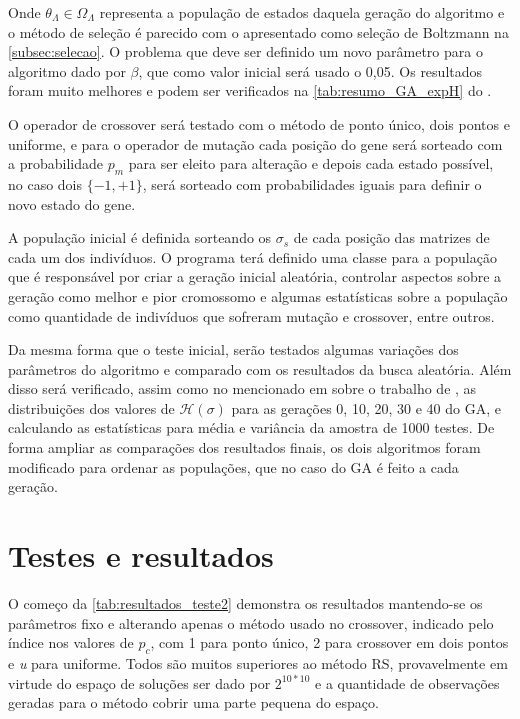 Onde \(\theta_{\Lambda} \in \Omega_{\Lambda} \) representa a população de estados daquela geração do algoritmo e o método de seleção é parecido com o apresentado como seleção de Boltzmann na \autoref{subsec:selecao}. O problema que deve ser definido um novo parâmetro para o algoritmo dado por \(\beta \), que como valor inicial será usado o 0,05. Os resultados foram muito melhores e podem ser verificados na \autoref{tab:resumo_GA_expH} do .

O operador de crossover será testado com o método de ponto único, dois pontos e uniforme, e para o operador de mutação cada posição do gene será sorteado com a probabilidade \(p_m\) para ser eleito para alteração e depois cada estado possível, no caso dois \(\{ -1, +1\}\), será sorteado com probabilidades iguais para definir o novo estado do gene.

A população inicial é definida sorteando os \(\sigma_s\) de cada posição das matrizes de cada um dos indivíduos. O programa terá definido uma classe para a população que é responsável por criar a geração inicial aleatória, controlar aspectos sobre a geração como melhor e pior cromossomo e algumas estatísticas sobre a população como quantidade de indivíduos que sofreram mutação e crossover, entre outros. 

Da mesma forma que o teste inicial, serão testados algumas variações dos parâmetros do algoritmo e comparado com os resultados da busca aleatória. Além disso será verificado, assim como no mencionado em  sobre o trabalho de , as distribuições dos valores de \(\mathcal{H}(\sigma)\) para as gerações 0, 10, 20, 30 e 40 do GA, e calculando as estatísticas para média e variância da amostra de 1000 testes. De forma ampliar as comparações dos resultados finais, os dois algoritmos foram modificado para ordenar as populações, que no caso do GA é feito a cada geração.

\section{Testes e resultados}
O começo da \autoref{tab:resultados_teste2} demonstra os resultados mantendo-se os parâmetros fixo e alterando apenas o método usado no crossover, indicado pelo índice nos valores de \(p_c\), com 1 para ponto único, 2 para crossover em dois pontos e \textit{u} para uniforme. Todos são muitos superiores ao método RS, provavelmente em virtude do espaço de soluções ser dado por \(2^{10*10}\) e a quantidade de observações geradas para o método cobrir uma parte pequena do espaço. 

